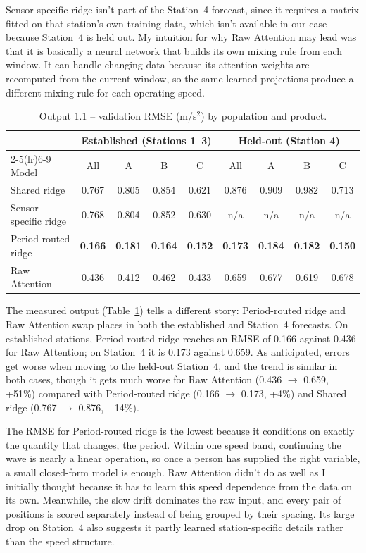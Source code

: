 \documentclass[11pt,a4paper]{article}
\begin{document}
Sensor-specific ridge isn't part of the Station~4 forecast, since it requires a matrix fitted on that station's own training data, which isn't available in our case because Station~4 is held out. My intuition for why Raw Attention may lead was that it is basically a neural network that builds its own mixing rule from each window. It can handle changing data because its attention weights are recomputed from the current window, so the same learned projections produce a different mixing rule for each operating speed.

\begin{table}[H]\centering\small
\caption{Output 1.1 -- validation RMSE (m/s$^2$) by population and product.}
\label{tab:out11}
\begin{tabular}{lcccccccc}
\toprule
 & \multicolumn{4}{c}{Established (Stations 1--3)} & \multicolumn{4}{c}{Held-out (Station 4)}\\
\cmidrule(lr){2-5}\cmidrule(lr){6-9}
Model & All & A & B & C & All & A & B & C\\
\midrule
Shared ridge          & 0.767 & 0.805 & 0.854 & 0.621 & 0.876 & 0.909 & 0.982 & 0.713\\
Sensor-specific ridge & 0.768 & 0.804 & 0.852 & 0.630 & n/a & n/a & n/a & n/a\\
Period-routed ridge   & \textbf{0.166} & \textbf{0.181} & \textbf{0.164} & \textbf{0.152} & \textbf{0.173} & \textbf{0.184} & \textbf{0.182} & \textbf{0.150}\\
Raw Attention         & 0.436 & 0.412 & 0.462 & 0.433 & 0.659 & 0.677 & 0.619 & 0.678\\
\bottomrule
\end{tabular}
\end{table}

The measured output (Table~\ref{tab:out11}) tells a different story: Period-routed ridge and Raw Attention swap places in both the established and Station~4 forecasts. On established stations, Period-routed ridge reaches an RMSE of 0.166 against 0.436 for Raw Attention; on Station~4 it is 0.173 against 0.659. As anticipated, errors get worse when moving to the held-out Station~4, and the trend is similar in both cases, though it gets much worse for Raw Attention (0.436 $\to$ 0.659, +51\%) compared with Period-routed ridge (0.166 $\to$ 0.173, +4\%) and Shared ridge (0.767 $\to$ 0.876, +14\%).

The RMSE for Period-routed ridge is the lowest because it conditions on exactly the quantity that changes, the period. Within one speed band, continuing the wave is nearly a linear operation, so once a person has supplied the right variable, a small closed-form model is enough. Raw Attention didn't do as well as I initially thought because it has to learn this speed dependence from the data on its own. Meanwhile, the slow drift dominates the raw input, and every pair of positions is scored separately instead of being grouped by their spacing. Its large drop on Station~4 also suggests it partly learned station-specific details rather than the speed structure.
\end{document}
